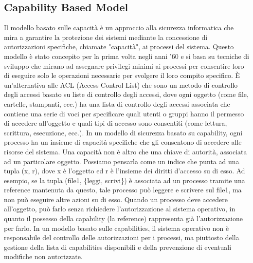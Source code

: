\subsection{Capability Based Model}
Il modello basato sulle capacità è un approccio alla sicurezza informatica che mira a garantire la protezione dei
sistemi mediante la concessione di autorizzazioni specifiche, chiamate "capacità", ai processi del sistema. Questo
modello è stato concepito per la prima volta negli anni '60\cite{capability-based-security} e si basa su tecniche di
sviluppo che mirano ad assegnare privilegi minimi\cite{Saltzer1975ThePO} ai processi per consentire loro di eseguire
solo le operazioni necessarie per svolgere il loro compito specifico. È un'alternativa alle ACL (Access Control
List)\cite{samarati2001access} che sono un metodo di controllo degli accessi basato su liste di controllo degli accessi,
dove ogni oggetto (come file, cartelle, stampanti, ecc.) ha una lista di controllo degli accessi associata che contiene
una serie di voci per specificare quali utenti o gruppi hanno il permesso di accedere all'oggetto e quali tipi di
accesso sono consentiti (come lettura, scrittura, esecuzione, ecc.). In un modello di sicurezza basato su capability,
ogni processo ha un insieme di capacità specifiche che gli consentono di accedere alle risorse del sistema. Una capacità
non è altro che una chiave di autorità, associata ad un particolare oggetto. Possiamo pensarla come un indice che punta
ad una tupla\cite{wasm-capability-tuple} (x, r), dove x è l'oggetto ed r è l'insieme dei diritti d'accesso su di esso.
Ad esempio, se la tupla (file1, \{leggi, scrivi\}) è associata ad un processo tramite una reference mantenuta da questo,
tale processo può leggere e scrivere sul file1, ma non può eseguire altre azioni su di esso. Quando un processo deve
accedere all'oggetto, può farlo senza richiedere l'autorizzazione al sistema operativo, in quanto il possesso della
capability (la reference) rappresenta già l'autorizzazione per farlo. In un modello basato sulle capabilities, il
sistema operativo non è responsabile del controllo delle autorizzazioni per i processi, ma piuttosto della gestione
della lista di capabilities disponibili e della prevenzione di eventuali modifiche non autorizzate.
